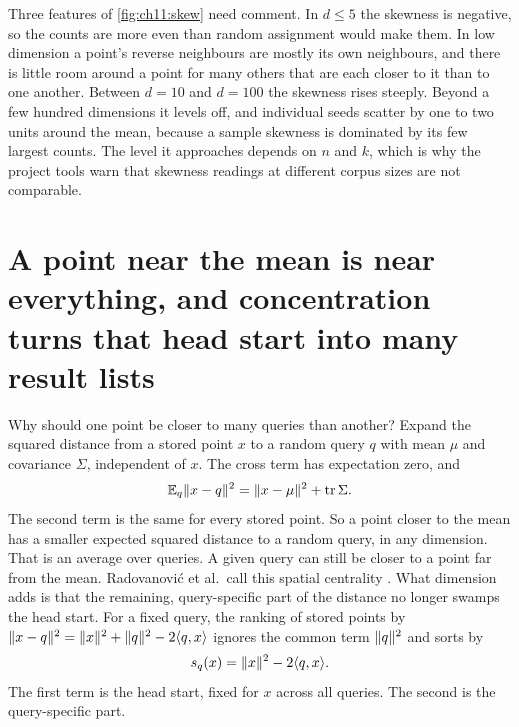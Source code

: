 Three features of \cref{fig:ch11:skew} need comment. In $d\le5$ the skewness is negative, so the counts are more even than random assignment would make them. In low dimension a point's reverse neighbours are mostly its own neighbours, and there is little room around a point for many others that are each closer to it than to one another. Between $d=10$ and $d=100$ the skewness rises steeply. Beyond a few hundred dimensions it levels off, and individual seeds scatter by one to two units around the mean, because a sample skewness is dominated by its few largest counts. The level it approaches depends on $n$ and $k$, which is why the project tools warn that skewness readings at different corpus sizes are not comparable.



\section{A point near the mean is near everything, and concentration turns that head start into many result lists}\label{sec:ch11:centrality}

Why should one point be closer to many queries than another? Expand the squared distance from a stored point $x$ to a random query $q$ with mean $\mu$ and covariance $\Sigma$, independent of $x$. The cross term has expectation zero, and
\begin{equation}\label{eq:ch11:central}
\mathbb{E}_q\lVert x-q\rVert^2=\lVert x-\mu\rVert^2+\operatorname{tr}\Sigma .
\end{equation}
The second term is the same for every stored point. So a point closer to the mean has a smaller expected squared distance to a random query, in any dimension. That is an average over queries. A given query can still be closer to a point far from the mean. Radovanovi\'c et al.\ call this spatial centrality \cite{radovanovic2010}. What dimension adds is that the remaining, query-specific part of the distance no longer swamps the head start. For a fixed query, the ranking of stored points by $\lVert x-q\rVert^2=\lVert x\rVert^2+\lVert q\rVert^2-2\langle q,x\rangle$ ignores the common term $\lVert q\rVert^2$ and sorts by
\begin{equation}\label{eq:ch11:score}
s_q(x)=\lVert x\rVert^2-2\langle q,x\rangle.
\end{equation}
The first term is the head start, fixed for $x$ across all queries. The second is the query-specific part.

